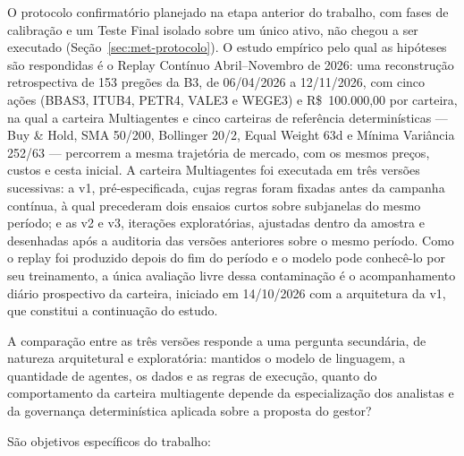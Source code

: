 O protocolo confirmatório planejado na etapa anterior do trabalho, com fases de calibração e um Teste Final isolado sobre um único ativo, não chegou a ser executado (Seção~\ref{sec:met-protocolo}). O estudo empírico pelo qual as hipóteses são respondidas é o Replay Contínuo Abril--Novembro de 2026: uma reconstrução retrospectiva de 153 pregões da B3, de 06/04/2026 a 12/11/2026, com cinco ações (BBAS3, ITUB4, PETR4, VALE3 e WEGE3) e R\$~100.000,00 por carteira, na qual a carteira Multiagentes e cinco carteiras de referência determinísticas --- Buy \& Hold, SMA 50/200, Bollinger 20/2, Equal Weight 63d e Mínima Variância 252/63 --- percorrem a mesma trajetória de mercado, com os mesmos preços, custos e cesta inicial. A carteira Multiagentes foi executada em três versões sucessivas: a v1, pré-especificada, cujas regras foram fixadas antes da campanha contínua, à qual precederam dois ensaios curtos sobre subjanelas do mesmo período; e as v2 e v3, iterações exploratórias, ajustadas dentro da amostra e desenhadas após a auditoria das versões anteriores sobre o mesmo período. Como o replay foi produzido depois do fim do período e o modelo pode conhecê-lo por seu treinamento, a única avaliação livre dessa contaminação é o acompanhamento diário prospectivo da carteira, iniciado em 14/10/2026 com a arquitetura da v1, que constitui a continuação do estudo.

A comparação entre as três versões responde a uma pergunta secundária, de natureza arquitetural e exploratória: mantidos o modelo de linguagem, a quantidade de agentes, os dados e as regras de execução, quanto do comportamento da carteira multiagente depende da especialização dos analistas e da governança determinística aplicada sobre a proposta do gestor?

São objetivos específicos do trabalho:

